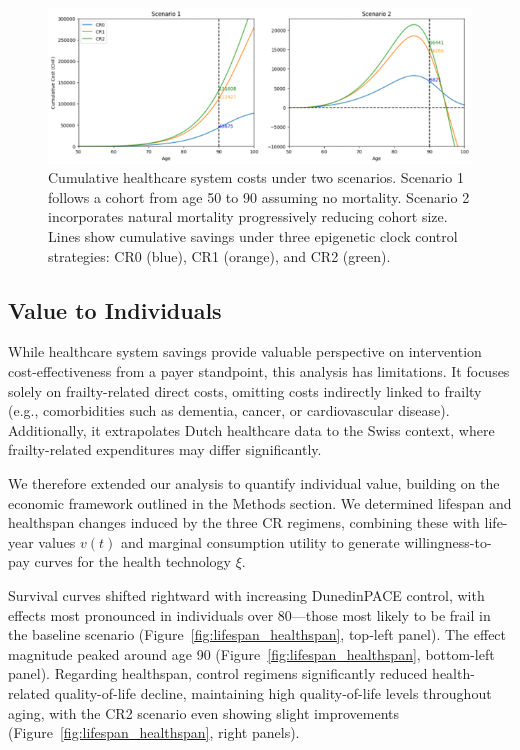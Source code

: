 \begin{figure}[h]
\centering
\small
\includegraphics[width=\textwidth]{figures/Figure5.png}
\caption{Cumulative healthcare system costs under two scenarios. Scenario 1 follows a cohort from age 50 to 90 assuming no mortality. Scenario 2 incorporates natural mortality progressively reducing cohort size. Lines show cumulative savings under three epigenetic clock control strategies: CR0 (blue), CR1 (orange), and CR2 (green).}
\label{fig:savings}
\end{figure}

\subsection{Value to Individuals}

While healthcare system savings provide valuable perspective on intervention cost-effectiveness from a payer standpoint, this analysis has limitations. It focuses solely on frailty-related direct costs, omitting costs indirectly linked to frailty (e.g., comorbidities such as dementia, cancer, or cardiovascular disease). Additionally, it extrapolates Dutch healthcare data to the Swiss context, where frailty-related expenditures may differ significantly.

We therefore extended our analysis to quantify individual value, building on the economic framework outlined in the Methods section. We determined lifespan and healthspan changes induced by the three CR regimens, combining these with life-year values $v(t)$ and marginal consumption utility to generate willingness-to-pay curves for the health technology $\xi$.

Survival curves shifted rightward with increasing DunedinPACE control, with effects most pronounced in individuals over 80—those most likely to be frail in the baseline scenario (Figure~\ref{fig:lifespan_healthspan}, top-left panel). The effect magnitude peaked around age 90 (Figure~\ref{fig:lifespan_healthspan}, bottom-left panel). Regarding healthspan, control regimens significantly reduced health-related quality-of-life decline, maintaining high quality-of-life levels throughout aging, with the CR2 scenario even showing slight improvements (Figure~\ref{fig:lifespan_healthspan}, right panels).

